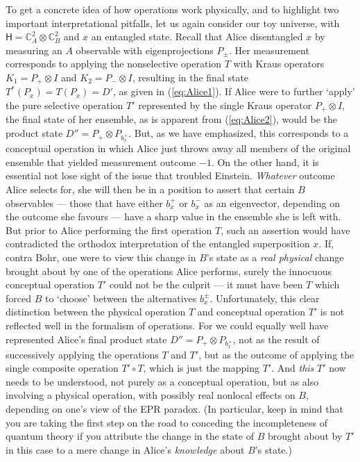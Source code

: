 \documentclass[12pt]{article}
\newcommand{\hil}[1]{\mbox{$\mathsf{#1}$}}
\begin{document}
To get a concrete idea of how operations work physically, and to highlight 
two important
interpretational pitfalls, let us again consider our
toy universe, with $\hil{H}=
\mathbb{C}_{A}^{2}\otimes\mathbb{C}_{B}^{2}$ and $x$ an entangled 
state.
Recall that Alice 
disentangled $x$ by measuring an $A$ observable with eigenprojections
$P_{\pm}$.  Her measurement corresponds to applying the nonselective 
operation $T$ 
with Kraus operators $K_{1}=P_{+}\otimes I$ and $K_{2}=P_{-}\otimes 
I$, resulting in the final state $T^{*}(P_{x})= T(P_{x})=D'$, as given in 
(\ref{eq:Alice1}).  If Alice were to further 
`apply' the pure 
selective operation $T'$ represented by the single Kraus operator $P_{+}\otimes 
I$, the final state of her 
ensemble, as is apparent from (\ref{eq:Alice2}), would be the product state 
$D''=P_{+}\otimes 
P_{b_{x}^{+}}$.  But, as we have emphasized, this corresponds 
to a conceptual operation in which Alice just throws away all members of 
the original ensemble that yielded measurement outcome $-1$.  
On the 
other hand, it is essential not lose sight of the issue that troubled Einstein. 
\emph{Whatever} outcome Alice selects for, she will then be in a 
position to assert that certain $B$ observables --- those that have either 
$b_{x}^{+}$ or $b_{x}^{-}$ as an eigenvector, depending on the outcome 
she favours --- have a 
sharp value in the ensemble she is left with. 
But  prior to Alice performing the first operation $T$, such an  
assertion would have contradicted the orthodox interpretation of the 
entangled superposition $x$.  If, contra Bohr, one were to view this change in 
$B$'s state as a \emph{real physical} change brought about by one of the operations Alice performs, 
surely the innocuous conceptual operation $T'$ could not be the 
culprit --- it must have been $T$ which forced
$B$ to `choose' between the alternatives $b_{x}^{\pm}$.  
Unfortunately, this clear distinction between the physical operation $T$ and conceptual 
operation $T'$ is not reflected well in the formalism
of operations.  For we could equally well have represented Alice's final product state 
$D''=P_{+}\otimes 
P_{b_{x}^{+}}$, not as the result of successively applying the 
operations $T$ and 
$T'$, but as the outcome of applying the single composite operation 
$T'\circ T$, which is just the mapping $T'$.  And \emph{this} $T'$ now needs to be 
understood, not purely as a conceptual operation, but as also involving a physical operation, 
with possibly real nonlocal effects on $B$, depending on one's view of the EPR 
paradox.  (In particular, keep in mind that you are taking the first step on the road to 
conceding the incompleteness of quantum theory if you attribute 
the change in the state of $B$ brought about 
by $T'$ in this case to a mere change in 
Alice's \emph{knowledge} about $B$'s state.) 
\end{document}
